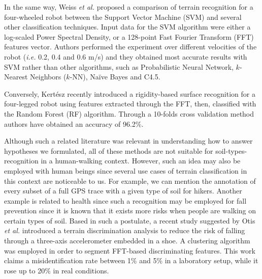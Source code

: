 \documentclass[10pt,conference]{IEEEtran}
\begin{document}

In the same way, Weiss \textit{et al.} \cite{Weiss2007} proposed a comparison of terrain recognition for a four-wheeled robot between the Support Vector Machine (SVM) and several other classification techniques. Input data for the SVM algorithm were either a log-scaled Power Spectral Density, or a 128-point Fast Fourier Transform (FFT) features vector. Authors performed the experiment over different velocities of the robot (\textit{i.e.} 0.2, 0.4 and 0.6 m/s) and they obtained most accurate results with SVM rather than other algorithms, such as Probabilistic Neural Network, $k$-Nearest Neighbors ($k$-NN), Na\"ive Bayes and C4.5.

Conversely, Kert\'esz \cite{Kertesz2016} recently introduced a rigidity-based surface recognition for a four-legged robot using features extracted through the FFT, then, classified with the Random Forest (RF) algorithm. Through a 10-folds cross validation method authors have obtained an accuracy of 96.2\%.

Although such a related literature was relevant in understanding how to answer hypotheses we formulated, all of these methods are not suitable for soil-types-recognition in a human-walking context. However, such an idea may also be employed with human beings since several use cases of terrain classification in this context are noticeable to us. For example, we can mention the annotation of every subset of a full GPS trace with a given type of soil for hikers. Another example is related to health since such a recognition may be employed for fall prevention since it is known that it exists more risks when people are walking on certain types of soil. Based in such a postulate, a recent study suggested by Otis \textit{et al.} \cite{Otis2016} introduced a terrain discrimination analysis to reduce the risk of falling through a three-axis accelerometer embedded in a shoe. A clustering algorithm was employed in order to segment FFT-based discriminating features. This work claims a misidentification rate between 1\% and 5\% in a laboratory setup, while it rose up to 20\% in real conditions.
\end{document}
